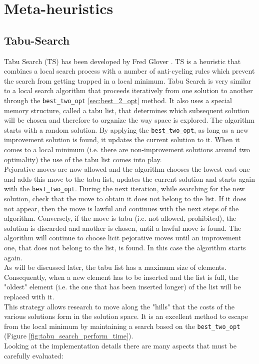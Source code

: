 \chapter{Meta-heuristics}

\section{Tabu-Search}
Tabu Search (TS) has been developed by Fred Glover \cite{Glover1998}. TS is a heuristic that combines a local search process with a number of anti-cycling rules which prevent the search from getting trapped in a local minimum. Tabu Search is very similar to a local search algorithm that proceeds iteratively from one solution to another through the \texttt{best\_two\_opt} \ref{sec:best_2_opt} method. It also uses a special memory structure, called a tabu list, that determines which subsequent solution will be chosen and therefore to organize the way space is explored. The algorithm starts with a random solution. By applying the \texttt{best\_two\_opt}, as long as a new improvement solution is found, it updates the current solution to it. When it comes to a local minimum (i.e. there are non-improvement solutions around two optimality) the use of the tabu list comes into play.\\
Pejorative moves are now allowed and the algorithm chooses the lowest cost one and adds this move to the tabu list, updates the current solution and starts again with the \texttt{best\_two\_opt}.
During the next iteration, while searching for the new solution, check that the move to obtain it does not belong to the list. If it does not appear, then the move is lawful and continues with the next steps of the algorithm. Conversely, if the move is tabu (i.e. not allowed, prohibited), the solution is discarded and another is chosen, until a lawful move is found. The algorithm will continue to choose licit pejorative moves until an improvement one, that does not belong to the list, is found. In this case the algorithm starts again.\\
As will be discussed later, the tabu list has a maximum size of elements. Consequently, when a new element has to be inserted and the list is full, the "oldest" element (i.e. the one that has been inserted longer) of the list will be replaced with it.\\
This strategy allows research to move along the "hills" that the costs of the various solutions form in the solution space. It is an excellent method to escape from the local minimum by maintaining a search based on the \texttt{best\_two\_opt} (Figure \ref{fig:tabu_search_perform_time}).\\
Looking at the implementation details there are many aspects that must be carefully evaluated:

